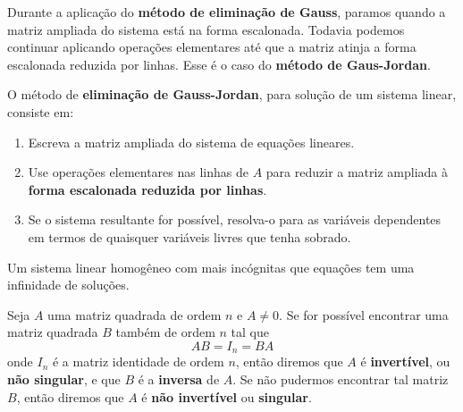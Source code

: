 \documentclass{beamer}
\begin{document}
    \begin{frame}
        Durante a aplicação do \textbf{método de eliminação de Gauss}, paramos quando a matriz ampliada do sistema está na forma escalonada.
        Todavia podemos continuar aplicando operações elementares até que a matriz atinja a forma escalonada reduzida por linhas. Esse é o caso do 
        \textbf{método de Gaus-Jordan}.

        \begin{definicao}
            O método de \textbf{eliminação de Gauss-Jordan}, para solução de um sistema linear, consiste em:
            \begin{enumerate}[label={\roman*})]
                \item Escreva a matriz ampliada do sistema de equações lineares.

                \item Use operações elementares nas linhas de $A$ para reduzir a matriz ampliada à \textbf{forma escalonada reduzida por linhas}.
                
                \item Se o sistema resultante for possível, resolva-o para as variáveis dependentes em termos de quaisquer variáveis livres que tenha sobrado.
            \end{enumerate}
        \end{definicao}
    \end{frame}

    \begin{frame}
        \begin{teorema}
            Um sistema linear homogêneo com mais incógnitas que equações tem uma infinidade de soluções.
        \end{teorema}
    \end{frame}


    \begin{frame}
        \begin{definicao}
            Seja $A$ uma matriz quadrada de ordem $n$ e $A \ne 0$. Se for possível encontrar uma matriz quadrada $B$ também de 
            ordem $n$ tal que
            \[
                AB = I_n = BA  
            \]
            onde $I_n$ é a matriz identidade de ordem $n$, então diremos que $A$ é \textbf{invertível}, ou \textbf{não singular}, 
            e que $B$ é a \textbf{inversa} de $A$. Se não pudermos encontrar tal matriz $B$, então diremos que $A$ é \textbf{não invertível} 
            ou \textbf{singular}.
        \end{definicao}
    \end{frame}
\end{document}
